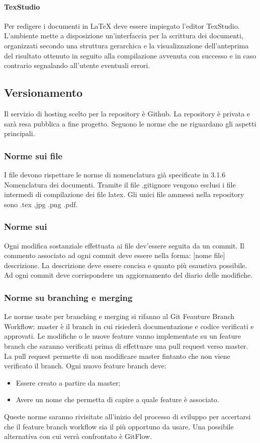 \paragraph{TexStudio} \Spazio
Per redigere i documenti in \LaTeX \emph{ }deve essere impiegato l'editor TexStudio. L'ambiente mette a disposizione un'interfaccia per la scrittura dei documenti, organizzati secondo una struttura gerarchica e la visualizzazione dell'anteprima del risultato ottenuto in seguito alla compilazione avvenuta con successo e in caso contrario segnalando all'utente eventuali errori.


\subsection{Versionamento}
Il servizio di hosting scelto per la repository è Github. La repository è
privata e sarà resa pubblica a fine progetto. Seguono le norme che ne riguardano gli aspetti
principali.
\subsubsection{Norme sui file}
I file devono rispettare le norme di nomenclatura già specificate in 3.1.6 Nomenclatura dei documenti.
Tramite il file .gitignore vengono esclusi i file intermedi di compilazione dei file latex.
Gli unici file ammessi nella repository sono .tex .jpg .png .pdf.

\subsubsection{Norme sui }
Ogni modifica sostanziale effettuata ai file dev'essere seguita da un commit. Il commento associato ad ogni commit deve essere nella forma: [nome file] descrizione.
La descrizione deve essere concisa e quanto più esaustiva possibile. Ad ogni commit deve corrispondere un aggiornamento del diario delle modifiche.

\subsubsection{Norme su branching e merging}
Le norme usate per branching e merging si rifanno al Git Feauture Branch Workflow:
master è il branch in cui risiederà documentazione e codice verificati e approvati.
Le modifiche o le nuove feature vanno implementate su un feature branch che saranno verificati
prima di effettuare una pull request verso master.
La pull request permette di non modificare master fintanto che non viene verificato il branch.
Ogni nuovo feature branch deve:
\begin{itemize}
	\item Essere creato a partire da master;
	\item Avere un nome che permetta di capire a quale feature è associato.
\end{itemize}
Queste norme saranno rivisitate all'inizio del processo di sviluppo per accertarsi che il feature branch workflow sia il più opportuno da usare. Una possibile alternativa con cui verrà confrontato è GitFlow.

